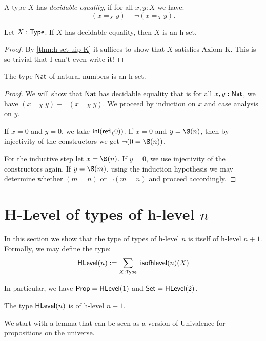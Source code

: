 \begin{defn}
 A type $X$ has {\em decidable equality}, if for all $x, y : X$ we have:
 \[(x =_X y) + \neg (x =_X y).\]
\end{defn}

\begin{thm}
 Let $X : \mathsf{Type}$. If $X$ has decidable equality, then $X$ is an h-set.
\end{thm}

\begin{proof}
 By \autoref{thm:h-set-uip-K} it suffices to show that $X$ satisfies Axiom K. This is so trivial that I can't even write it!
\end{proof}

\begin{thm}\label{prop:nat-is-set}
 The type $\mathsf{Nat}$ of natural numbers is an h-set.
\end{thm}

\begin{proof}
 We will show that $\mathsf{Nat}$ has decidable equality that is for all $x, y : \mathsf{Nat}$, we have $(x =_X y) + \neg (x =_X y)$.
 We proceed by induction on $x$ and case analysis on $y$.

 If $x = 0$ and $y = 0$, we take $\mathsf{inl}(\mathsf{refl}_{(}0))$. If $x = 0$ and $y = \S(n)$,
 then by injectivity of the constructors we get $\neg (0 = \S (n))$.

 For the inductive step let $x = \S (n)$. If $y = 0$, we use injectivity of the constructors again.
 If $y = \S (m)$, using the induction hypothesis we may determine whether $(m = n)$ or $\neg(m = n)$ and proceed accordingly.
\end{proof}

\section{H-Level of types of h-level $n$}

In this section we show that the type of types of h-level $n$ is itself of h-level $n+1$. Formally, we may define the type:
 \[\HLevel(n) := \sum_{X : \type} \ \isofhlevel(n)(X) \]

In particular, we have $\mathsf{Prop} = \mathsf{HLevel}(1)$ and $\mathsf{Set} = \mathsf{HLevel}(2)$.

\begin{thm}\label{thm:hleveln_of_hlevelSn}
 The type $\mathsf{HLevel}(n)$ is of h-level $n+1$.
\end{thm}

We start with a lemma that can be seen as a version of Univalence for propositions on the universe.

